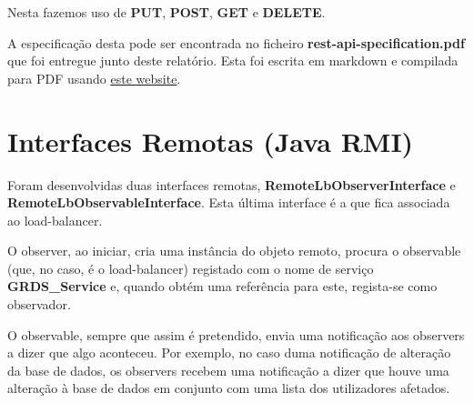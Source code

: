 \documentclass[11pt]{article}
\begin{document}
	Nesta fazemos uso de \textbf{PUT}, \textbf{POST}, \textbf{GET} e \textbf{DELETE}.
		
	A especificação desta pode ser encontrada no ficheiro \textbf{rest-api-specification.pdf} que foi entregue junto deste relatório. Esta foi escrita em markdown e compilada para PDF usando \color{blue}\underline{\href{https://md2pdf.netlify.app/}{este website}}\color{black}.
	
	
	\large
	\section{Interfaces Remotas (Java RMI)}
	\normalsize
	
	Foram desenvolvidas duas interfaces remotas, \textbf{RemoteLbObserverInterface} e \textbf{RemoteLbObservableInterface}. Esta última interface é a que fica associada ao load-balancer.
	
	O observer, ao iniciar, cria uma instância do objeto remoto, procura o observable (que, no caso, é o load-balancer) registado com o nome de serviço \textbf{GRDS\_Service} e, quando obtém uma referência para este, regista-se como observador.
	
	O observable, sempre que assim é pretendido, envia uma notificação aos observers a dizer que algo aconteceu. Por exemplo, no caso duma notificação de alteração da base de dados, os observers recebem uma notificação a dizer que houve uma alteração à base de dados em conjunto com uma lista dos utilizadores afetados.
	
	
\end{document}
